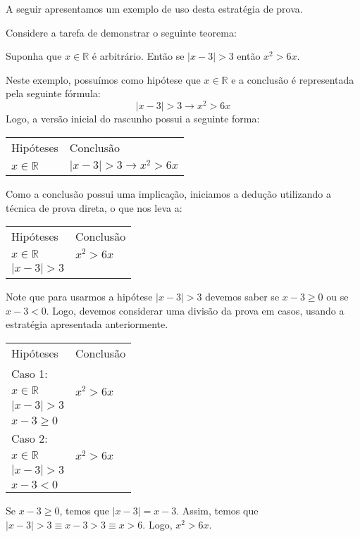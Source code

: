 A seguir apresentamos um exemplo de uso desta estratégia de prova.
\begin{Example}
Considere a tarefa de demonstrar o seguinte teorema:
\begin{flushleft}
Suponha que $x\in\mathbb{R}$ é arbitrário. Então se $|x - 3| > 3$
então $x^2 > 6x$.
\end{flushleft}
Neste exemplo, possuímos como hipótese que $x\in\mathbb{R}$ e a
conclusão é representada pela seguinte fórmula:
\[
|x - 3| > 3 \to x^2 > 6x
\]
Logo, a versão inicial do rascunho possui a seguinte forma:
\begin{flushleft}
\begin{tabular}{ll}
Hipóteses & Conclusão \\
$x\in\mathbb{R}$ & $|x - 3| > 3 \to x^2 > 6x$\\
\end{tabular}
\end{flushleft}
Como a conclusão possui uma implicação, iniciamos a dedução utilizando
a técnica de prova direta, o que nos leva a:
\begin{flushleft}
\begin{tabular}{ll}
Hipóteses & Conclusão \\
$x\in\mathbb{R}$ & $x^2 > 6x$\\
$|x - 3| > 3$ &
\end{tabular}
\end{flushleft}
Note que para usarmos a hipótese $|x- 3| > 3$ devemos saber se $x - 3
\geq 0$ ou se $x - 3 < 0$. Logo, devemos considerar uma divisão da
prova em casos, usando a estratégia apresentada anteriormente.
\begin{flushleft}
\begin{tabular}{ll}
Hipóteses & Conclusão \\
Caso 1: & \\
$x\in\mathbb{R}$ & $x^2 > 6x$\\
$|x - 3| > 3$ & \\
$x - 3 \geq 0$ & \\
Caso 2: & \\
$x\in\mathbb{R}$ & $x^2 > 6x$\\
$|x - 3| > 3$ & \\
$x - 3 < 0$ & \\
\end{tabular}
\end{flushleft}
Se $x- 3 \geq 0$, temos que $|x - 3| = x - 3$. Assim, temos que $|x -
3| > 3 \equiv x - 3 > 3 \equiv x > 6$. Logo, $x^2 > 6x$.


\end{Example}
